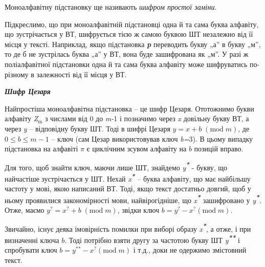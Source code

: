 \documentclass[a4paper]{article}
\newcommand\textsubscript[1]{\ensuremath{{}_{\text{#1}}}}
\newcounter{}
\begin{document}
Моноалфавітну підстановку ще називають \textit{шифром простої заміни}.

Підкреслимо, що при моноалфавітній підстановці одна й та сама буква алфавіту, що
зустрічається у ВТ, шифрується тією ж самою буквою ШТ незалежно від її місця у
тексті. Наприклад, якщо підстановка \textbf{\textit{\textgreek{p}}} переводить
букву „а” в  букву „м”, то де б не зустрілась буква „а” у ВТ, вона буде
зашифрована як „м”. У разі ж поліалфавітної підстановки одна й та сама буква
алфавіту може шифруватись по-різному в залежності від її місця у ВТ.


\bigskip


\bigskip

{\centering\bfseries\itshape
Шифр Цезаря
\par}


\bigskip


\bigskip

Найпростіша моноалфавітна підстановка – це шифр Цезаря. Ототожнимо букви
алфавіту \textit{Z}\textit{\textsubscript{m}} з числами від\textbf{ }0 до
\textit{m-}1 і позначимо через \textit{x} довільну букву ВТ, а через \textit{y}
– відповідну букву ШТ. Тоді в шифрі Цезаря   ${y=x+b\;(\text{mod}\;m)}$, де 
${0\le b\le m-1}$ – ключ (сам Цезар використовував ключ \textit{b}\textit{=}3).
В цьому випадку підстановка на алфавіті  ${\pi }$ є циклічним зсувом алфавіту
на  ${b}$ позицій вправо.

Для того, щоб знайти ключ, маючи лише ШТ, знайдемо
\textit{y}\textbf{\textit{\textsuperscript{*}}} - букву, що найчастіше
зустрічається у ШТ. Нехай \textit{x}\textbf{\textit{\textsuperscript{*}}} –
буква алфавіту, що має найбільшу частоту у мові, якою написаний ВТ. Тоді, якщо
текст достатньо довгий, щоб у ньому проявилися закономірності мови,
найвірогідніше, що \textit{x}\textbf{\textit{\textsuperscript{*}}} зашифровано
у  \textit{y}\textbf{\textit{\textsuperscript{*}}}. Отже, маємо 
${y^{{?}}=x^{{?}}+b\;(\text{mod}\;m)}$, звідки ключ 
${b=y^{{?}}-x^{{?}}(\text{mod}\;m)}$.

Звичайно, існує деяка імовірність помилки при виборі образу
\textit{x}\textbf{\textit{\textsuperscript{*}}}, а отже, і при визначенні ключа
 ${b}$. Тоді потрібно взяти другу за частотою букву ШТ
\textit{y}\textbf{\textit{\textsuperscript{** }}}і спробувати ключ  
${b=y^{{\text{**}}}-x^{{?}}(\text{mod}\;m)}$ і т.д., доки не одержимо
змістовний текст.


\bigskip


\bigskip


\bigskip
\end{document}
